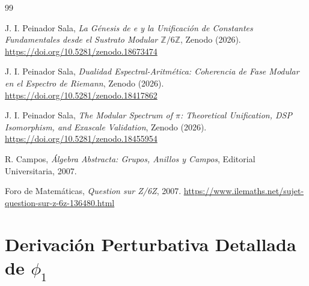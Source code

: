 \documentclass[12pt,a4paper]{article}
\theoremstyle{plain}
\theoremstyle{definition}
\theoremstyle{remark}
\begin{document}
\begin{thebibliography}{99}

J. I. Peinador Sala, \textit{La Génesis de e y la Unificación de Constantes Fundamentales desde el Sustrato Modular $\mathbb{Z}/6\mathbb{Z}$}, Zenodo (2026). \url{https://doi.org/10.5281/zenodo.18673474}

J. I. Peinador Sala, \textit{Dualidad Espectral-Aritmética: Coherencia de Fase Modular en el Espectro de Riemann}, Zenodo (2026). \url{https://doi.org/10.5281/zenodo.18417862}

J. I. Peinador Sala, \textit{The Modular Spectrum of $\pi$: Theoretical Unification, DSP Isomorphism, and Exascale Validation}, Zenodo (2026). \url{https://doi.org/10.5281/zenodo.18455954}

R. Campos, \textit{Álgebra Abstracta: Grupos, Anillos y Campos}, Editorial Universitaria, 2007.

Foro de Matemáticas, \textit{Question sur Z/6Z}, 2007. \url{https://www.ilemaths.net/sujet-question-sur-z-6z-136480.html}

\end{thebibliography}

\appendix

\section{Derivación Perturbativa Detallada de $\phi_1$}
\label{app:derivacion_phi1}
\end{document}
